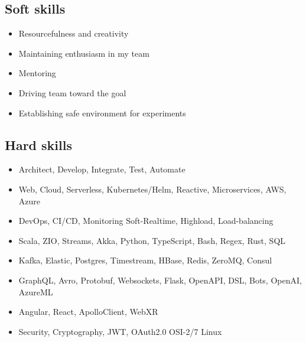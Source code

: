 
\subsection*{Soft skills}

\begin{itemize}[noitemsep, nosep]
  \item Resourcefulness and creativity
  \item Maintaining enthusiasm in my team
  \item Mentoring
  \item Driving team toward the goal
  \item Establishing safe environment for experiments
\end{itemize}

\subsection*{Hard skills}

\begin{itemize}[noitemsep, nosep]
  \item Architect, Develop, Integrate, Test, Automate
  \item Web, Cloud, Serverless, Kubernetes/Helm, Reactive, Microservices, AWS, Azure
  \item DevOps, CI/CD, Monitoring \textbar{} Soft-Realtime, Highload, Load-balancing
  \item Scala, ZIO, Streams, Akka, Python, TypeScript, Bash, Regex, Rust, SQL
  \item Kafka, Elastic, Postgres, Timestream, HBase, Redis, ZeroMQ, Consul
  \item GraphQL, Avro, Protobuf, Websockets, Flask, OpenAPI, DSL, Bots, OpenAI, AzureML
  \item Angular, React, ApolloClient, WebXR
  \item Security, Cryptography, JWT, OAuth2.0 \textbar{} OSI-2/7 \textbar{} Linux
\end{itemize}
